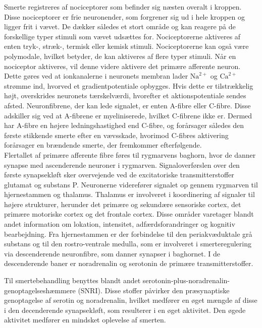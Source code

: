Smerte registreres af nociceptorer som befinder sig næsten overalt i kroppen. Disse nociceptorer er frie neuronender, som forgrener sig ud i hele kroppen og ligger frit i vævet. De dækker således et stort område og kan reagere på de forskellige typer stimuli som vævet udsættes for. Nociceptorerne aktiveres af enten tryk-, stræk-, termisk eller kemisk stimuli. Nociceptorerne kan også være polymodale, hvilket betyder, de kan aktiveres af flere typer stimuli. \citep{smerter} 
Når en nociceptor aktiveres, vil denne videre aktivere det primære afferente neuron. Dette gøres ved at ionkanalerne i neuronets membran lader $\text{Na}^{2+}$ og $\text{Ca}^{2+}$ strømme ind, hvorved et gradientpotentiale opbygges. Hvis dette er tilstrækkelig højt, overskrides neuronets tærskelværdi, hvorefter et aktionspotentiale sendes afsted. Neuronfibrene, der kan lede signalet, er enten A-fibre eller C-fibre. Disse adskiller sig ved at A-fibrene er myeliniserede, hvilket C-fibrene ikke er. Dermed har A-fibre en højere ledningshastighed end C-fibre, og forårsager således den første stikkende smerte efter en vævsskade, hvorimod C-fibres aktivering forårsager en brændende smerte, der fremkommer efterfølgende. \citep{smerter} \\
Flertallet af primære afferente fibre føres til rygmarvens baghorn, hvor de danner synapse med ascenderende neuroner i rygmarven. Signaloverførslen over den første synapsekløft sker overvejende ved de excitatoriske transmitterstoffer glutamat og substans P. 
Neuronerne viderefører signalet op gennem rygmarven til hjernestammen og thalamus. Thalamus er involveret i koordinering af signaler til højere strukturer, herunder det primære og sekundære sensoriske cortex, det primære motoriske cortex og det frontale cortex. Disse områder varetager blandt andet information om lokation, intensitet, adfærdsforandringer og kognitiv bearbejdning. Fra hjernestammen er der forbindelse til den periakvæduktale grå substans og til den rostro-ventrale medulla, som er involveret i smerteregulering via descenderende neuronfibre, som danner synapser i baghornet. I de descenderende baner er noradrenalin og serotonin de primære transmitterstoffer. \citep{smerter}

Til smertebehandling benyttes blandt andet serotonin-plus-noradrenalin-genoptagelseshæmmere (SNRI). Disse stoffer påvirker den præsynaptiske genoptagelse af serotin og noradrenalin, hvilket medfører en øget mængde af disse i den decenderende synapsekløft, som resulterer i en øget aktivitet. Den øgede aktivitet medfører en mindsket oplevelse af smerten. \citep{smerter}

